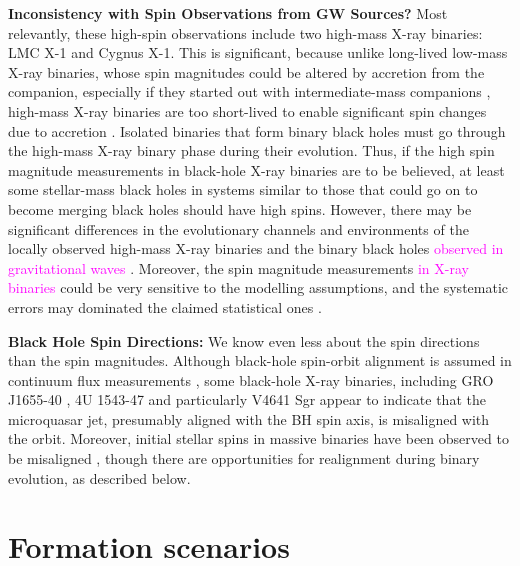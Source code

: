 \documentclass[iop,onecolumn]{revtex4}
\newcommand{\ilya}[1]{\textcolor{magenta}{#1}}
\begin{document}
\textbf{Inconsistency with Spin Observations from GW Sources?} Most relevantly, these high-spin observations include two high-mass X-ray binaries: LMC X-1 and Cygnus X-1.  This is significant, because unlike long-lived low-mass X-ray binaries, whose spin magnitudes could be altered by accretion from the companion, especially if they started out with intermediate-mass companions \citep{Podsiadlowski:2003,Fragos:2015}, high-mass X-ray binaries are too short-lived to enable significant spin changes due to accretion \citep{KingKolb:1999}.  %
Isolated binaries that form binary black holes must go through the high-mass X-ray binary phase during their evolution.  Thus, if the high spin magnitude measurements in black-hole X-ray binaries are to be believed, at least some stellar-mass black holes in systems similar to those that could go on to become merging black holes should have high spins.  However, there may be significant differences in the evolutionary channels and environments of the locally observed high-mass X-ray binaries and the binary black holes \ilya{observed in gravitational waves} \citep{HotokezakaPiran:2017}.  Moreover, the spin magnitude measurements \ilya{in X-ray binaries} could be very sensitive to the modelling assumptions, and the systematic errors may dominated the claimed statistical ones \citep[e.g.,][]{Basak:2017,Kawano:2017}.

\textbf{Black Hole Spin Directions:} We know even less about the spin directions than the spin magnitudes.  Although black-hole spin-orbit alignment is assumed in continuum flux measurements \citep{MillerMiller:2015}, some black-hole X-ray binaries, including GRO J1655-40 \citep{Martin:2008}, 4U 1543-47 \citep{MorningstarMiller:2014} and particularly V4641 Sgr \citep{Orosz:2001,Martin:2008b} appear to indicate that the microquasar jet, presumably aligned with the BH spin axis, is misaligned with the orbit.  Moreover, initial stellar spins in massive binaries have been observed to be misaligned \citep[e.g.,][]{Albrecht:2009,Albrecht:2014}, though there are opportunities for realignment during binary evolution, as described below.

\section{Formation scenarios}\label{form}
\end{document}
